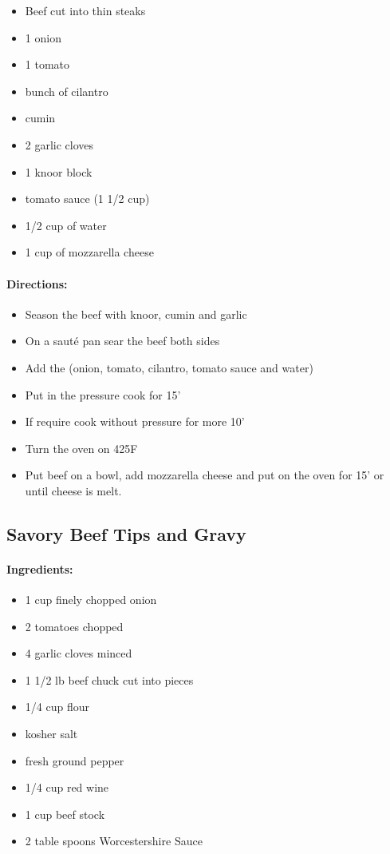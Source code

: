 \documentclass{article}
\begin{document}
\begin{itemize}
	\item Beef cut into thin steaks
	\item 1 onion
	\item 1 tomato
	\item bunch of cilantro
	\item cumin
	\item 2 garlic cloves
	\item 1 knoor block
	\item tomato sauce (1 1/2 cup)
	\item 1/2 cup of water
	\item 1 cup of mozzarella cheese
\end{itemize}

\paragraph{Directions:}
\begin{itemize}
	\item Season the beef with knoor, cumin and garlic
	\item On a sauté pan sear the beef both sides
	\item Add the (onion, tomato, cilantro, tomato sauce and water)
	\item Put in the pressure cook for 15'
	\item If require cook without pressure for more 10'
	\item Turn the oven on 425F
	\item Put beef on a bowl, add mozzarella cheese and put on the oven for 15' or until cheese is melt.
\end{itemize}

\subsection{Savory Beef Tips and Gravy}

\paragraph{Ingredients:}
\begin{itemize}
  \item 1 cup finely chopped onion
  \item 2 tomatoes chopped
  \item 4 garlic cloves minced
  \item 1 1/2 lb beef chuck cut into pieces
  \item 1/4 cup flour
  \item kosher salt
  \item fresh ground pepper
  \item 1/4 cup red wine
  \item 1 cup beef stock
  \item 2 table spoons Worcestershire Sauce	
\end{itemize}
\end{document}
